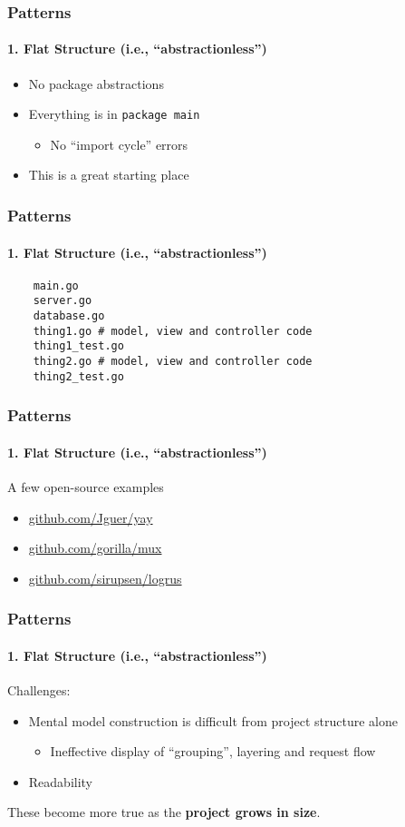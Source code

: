 \begin{frame}[fragile]
  \frametitle{Patterns}
  \framesubtitle{1. Flat Structure (i.e., ``abstractionless'')}

  \begin{itemize}
    \item No package abstractions
    \pause
    \item Everything is in \texttt{package main}
    \begin{itemize}
      \item No ``import cycle'' errors
    \end{itemize}
    \pause
    \item This is a great starting place
  \end{itemize}
\end{frame}

\begin{frame}[fragile]
  \frametitle{Patterns}
  \framesubtitle{1. Flat Structure (i.e., ``abstractionless'')}

  \begin{verbatim}
    main.go
    server.go
    database.go
    thing1.go # model, view and controller code
    thing1_test.go
    thing2.go # model, view and controller code
    thing2_test.go
  \end{verbatim}
\end{frame}

\begin{frame}[fragile]
  \frametitle{Patterns}
  \framesubtitle{1. Flat Structure (i.e., ``abstractionless'')}

  A few open-source examples
  \begin{itemize}
    \item \url{github.com/Jguer/yay}
    \item \url{github.com/gorilla/mux}
    \item \url{github.com/sirupsen/logrus}
  \end{itemize}

\end{frame}

\begin{frame}[fragile]
  \frametitle{Patterns}
  \framesubtitle{1. Flat Structure (i.e., ``abstractionless'')}

  Challenges:
  \begin{itemize}
    \pause
    \item Mental model construction is difficult from project structure alone
    \begin{itemize}
      \item Ineffective display of ``grouping'', layering and request flow
    \end{itemize}
    \pause
    \item Readability
  \end{itemize}

  \vspace{1em}
  \centering
  \pause
  These become more true as the \textbf{project grows in size}.

\end{frame}

